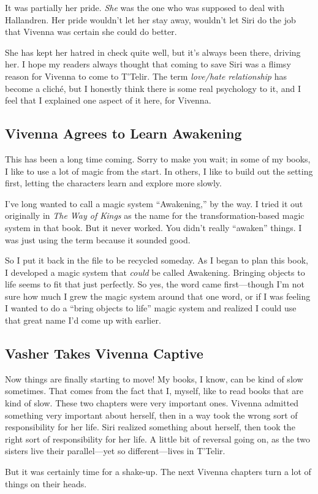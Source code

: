 It was partially her pride. \textit{She} was the one who was supposed to deal with Hallandren. Her pride wouldn’t let her stay away, wouldn’t let Siri do the job that Vivenna was certain she could do better.

She has kept her hatred in check quite well, but it’s always been there, driving her. I hope my readers always thought that coming to save Siri was a flimsy reason for Vivenna to come to T’Telir. The term \textit{love/hate relationship} has become a cliché, but I honestly think there is some real psychology to it, and I feel that I explained one aspect of it here, for Vivenna.

\subsection*{Vivenna Agrees to Learn Awakening}

This has been a long time coming. Sorry to make you wait; in some of my books, I like to use a lot of magic from the start. In others, I like to build out the setting first, letting the characters learn and explore more slowly.

I’ve long wanted to call a magic system “Awakening,” by the way. I tried it out originally in \textit{The Way of Kings} as the name for the transformation-based magic system in that book. But it never worked. You didn’t really “awaken” things. I was just using the term because it sounded good.

So I put it back in the file to be recycled someday. As I began to plan this book, I developed a magic system that \textit{could} be called Awakening. Bringing objects to life seems to fit that just perfectly. So yes, the word came first—though I’m not sure how much I grew the magic system around that one word, or if I was feeling I wanted to do a “bring objects to life” magic system and realized I could use that great name I’d come up with earlier.

\subsection*{Vasher Takes Vivenna Captive}

Now things are finally starting to move! My books, I know, can be kind of slow sometimes. That comes from the fact that I, myself, like to read books that are kind of slow. These two chapters were very important ones. Vivenna admitted something very important about herself, then in a way took the wrong sort of responsibility for her life. Siri realized something about herself, then took the right sort of responsibility for her life. A little bit of reversal going on, as the two sisters live their parallel—yet so different—lives in T’Telir.

But it was certainly time for a shake-up. The next Vivenna chapters turn a lot of things on their heads.



